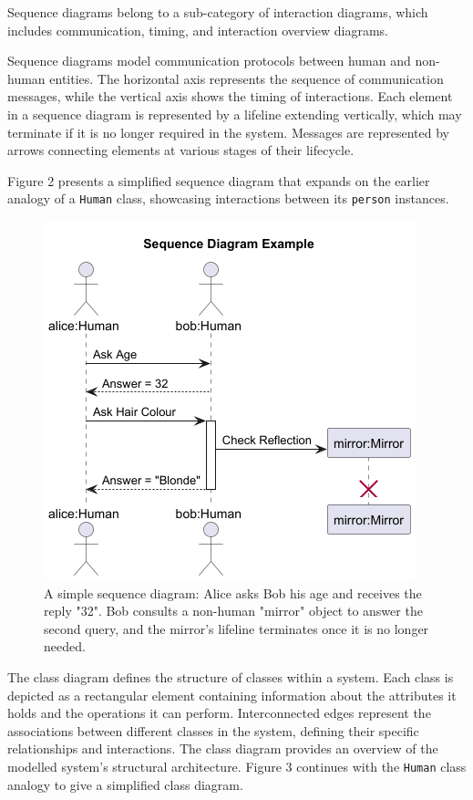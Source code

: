 \documentclass{article}
\newcounter{subsubsubsection}[subsubsection]
\begin{document}
{

Sequence diagrams belong to a sub-category of interaction diagrams, which includes communication, timing, and interaction overview diagrams\cite{Seidl_Scholz_Huemer_Kappel_Duffy_2014}.

Sequence diagrams model communication protocols between human and non-human entities. The horizontal axis represents the sequence of communication messages, while the vertical axis shows the timing of interactions. Each element in a sequence diagram is represented by a lifeline extending vertically, which may terminate if it is no longer required in the system. Messages are represented by arrows connecting elements at various stages of their lifecycle. 

Figure 2 presents a simplified sequence diagram that expands on the earlier analogy of a \texttt{Human} class, showcasing interactions between its \texttt{person} instances.

\begin{figure}[H]
    \centering
\includegraphics[width=0.7\linewidth]{SDexample-Sequence_Diagram_Example.png}
    \caption{A simple sequence diagram: Alice asks Bob his age and receives the reply "32". Bob consults a non-human "mirror" object to answer the second query, and the mirror's lifeline terminates once it is no longer needed.}
    \label{fig:Simple SD}
\end{figure}


The class diagram defines the structure of classes within a system\cite{Seidl_Scholz_Huemer_Kappel_Duffy_2014}. Each class is depicted as a rectangular element containing information about the attributes it holds and the operations it can perform. Interconnected edges represent the associations between different classes in the system, defining their specific relationships and interactions. The class diagram provides an overview of the modelled system's structural architecture. Figure 3 continues with the \texttt{Human} class analogy to give a simplified class diagram.

}
\end{document}
